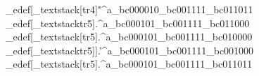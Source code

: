 \brl@char_edef[\brl@char_textstack{\brl@ueb@trD}{[tr4}]{"^a}{\brl@char_bc000010\brl@char_bc001111\brl@char_bc011011}%
\brl@char_edef[\brl@char_textstack{\brl@ueb@trE}{tr5}]{.^a}{\brl@char_bc000101\brl@char_bc001111\brl@char_bc011000}%
\brl@char_edef[\brl@char_textstack{\brl@ueb@trE}{[tr5}]{.^a}{\brl@char_bc000101\brl@char_bc001111\brl@char_bc010000}%
\brl@char_edef[\brl@char_textstack{\brl@ueb@trE}{tr5]}]{.\brl@@sharp '^a}{\brl@char_bc000101\brl@char_bc001111\brl@char_bc001000}%
\brl@char_edef[\brl@char_textstack{\brl@ueb@trE}{[tr5}]{.^a}{\brl@char_bc000101\brl@char_bc001111\brl@char_bc011011}%



